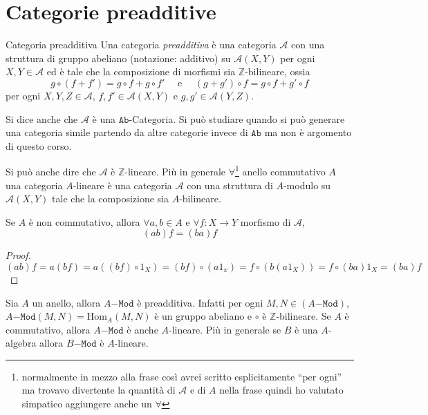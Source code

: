 \section{Categorie preadditive}
\begin{definition}{Categoria preadditiva}
    Una categoria \emph{preadditiva} è una categoria \(\mathcal{A}\) con una
    struttura di gruppo abeliano (notazione: additivo) su \(\mathcal{A}{(X, Y)}\) per ogni \(X, Y \in \mathcal{A}\) ed è tale che la composizione di morfismi sia \(\mathbb{Z}\)-bilineare, ossia
    \[
      g \circ {(f + f')} = g \circ f + g \circ f' \quad \text{ e } \quad {(g +
      g')} \circ f = g \circ f + g' \circ f 
    \]
    per ogni \(
    X, Y, Z \in \mathcal{A}\), \(f, f' \in \mathcal{A}{(X, Y)}\) e \(g, g' \in \mathcal{A}{(Y, Z)}\).
\end{definition}
\begin{remark}{}
    Si dice anche che \(\mathcal{A}\) è una \(\mathtt{Ab}\)-Categoria. Si può
    studiare quando si può generare una categoria simile partendo da altre
    categorie invece di \(\mathtt{Ab}\) ma non è argomento di questo corso.

    Si può anche dire che \(\mathcal{A}\) è \(\mathbb{Z}\)-lineare. Più in
    generale \(\forall\)\footnote{normalmente in mezzo alla frase così avrei scritto esplicitamente ``per ogni'' ma trovavo divertente la quantità di \(\mathcal{A}\) e di \(A\) nella frase quindi ho valutato simpatico aggiungere anche un \(\forall\)} anello commutativo \(A\) una categoria \(A\)-lineare è
    una categoria \(\mathcal{A}\) con una struttura di \(A\)-modulo su \(\mathcal{A}{(X,Y)}\) tale che la composizione sia \(A\)-bilineare.
\end{remark}
\begin{proposition}{}
    Se \(A\) è non commutativo, allora \(\forall a, b \in A\) e \(\forall f :
    X\to Y\) morfismo di \(\mathcal{A}\),
    \[
      {(ab)}f = {(ba)}f
    \]
\end{proposition}
\begin{proof}{}
    \[
      {(ab)}f = a{(bf)} = a{({(bf)}\circ 1_X)} = {(bf)} \circ {(a1_x)} = f \circ
      {(b{(a 1_X)})} = f \circ {(ba)}1_X = {(ba)}f
    \]
\end{proof}

\begin{example}{}
    Sia \(A\) un anello, allora \(A\mathtt{-Mod}\) è preadditiva. Infatti per
    ogni \(M, N \in {(A\mathtt{-Mod})}\), \(A\mathtt{-Mod}{(M, N)} = \mathrm{Hom}_A{(M, N)}\) è un gruppo abeliano e \(\circ\) è \(\mathbb{Z}\)-bilineare. Se \(A\) è commutativo, allora \(A\mathtt{-Mod}\) è anche \(A\)-lineare.
    Più in generale se \(B\) è una \(A\)-algebra allora \(B\mathtt{-Mod}\) è \(A\)-lineare.
\end{example}


